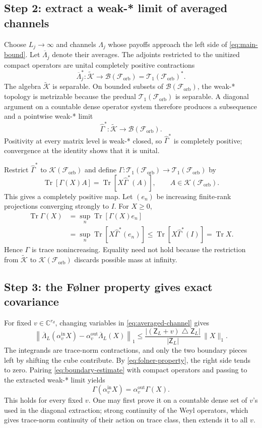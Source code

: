 \documentclass[11pt]{article}
\newcommand{\F}{\mathcal F_{\mathrm{orb}}}
\newcommand{\T}{\mathcal T_1}
\newcommand{\K}{\mathcal K}
\newcommand{\Bop}{\mathcal B}
\newcommand{\C}{\mathbb C}
\newcommand{\Tr}{\operatorname{Tr}}
\begin{document}
\subsection{Step 2: extract a weak-* limit of averaged channels}

Choose $L_j\to\infty$ and channels $\Lambda_j$ whose payoffs approach the
left side of \eqref{eq:main-bound}.  Let $\overline\Lambda_j$ denote their
averages.  The adjoints restricted to the unitized compact operators are
unital completely positive contractions
\[
  \overline\Lambda_j^*:
  \widetilde{\K}\longrightarrow\Bop(\F)=\T(\F)^*.
\]
The algebra $\widetilde{\K}$ is separable.  On bounded subsets of
$\Bop(\F)$, the weak-* topology is metrizable because the predual
$\T(\F)$ is separable.  A diagonal argument on a countable dense operator
system therefore produces a subsequence and a pointwise weak-* limit
\[
  \widehat\Gamma^*:
  \widetilde{\K}\longrightarrow\Bop(\F).
\]
Positivity at every matrix level is weak-* closed, so
$\widehat\Gamma^*$ is completely positive; convergence at the identity
shows that it is unital.

Restrict $\widehat\Gamma^*$ to $\K(\F)$ and define
$\Gamma:\T(\F)\to\T(\F)$ by
\begin{equation}\label{eq:limit-duality}
  \Tr[\Gamma(X)A]=\Tr[X\widehat\Gamma^*(A)],
  \qquad A\in\K(\F).
\end{equation}
This gives a completely positive map.  Let $(e_n)$ be increasing
finite-rank projections converging strongly to $I$.  For $X\geq0$,
\begin{align*}
  \Tr\Gamma(X)
  &=\sup_n\Tr[\Gamma(X)e_n]\\
  &=\sup_n\Tr[X\widehat\Gamma^*(e_n)]
  \leq\Tr[X\widehat\Gamma^*(I)]
  =\Tr X.
\end{align*}
Hence $\Gamma$ is trace nonincreasing.  Equality need not hold because the
restriction from $\widetilde{\K}$ to $\K(\F)$ discards possible mass at
infinity.

\subsection{Step 3: the F\o lner property gives exact covariance}

For fixed $v\in\C^{r_d}$, changing variables in
\eqref{eq:averaged-channel} gives
\begin{equation}\label{eq:boundary-estimate}
  \left\|
  \overline\Lambda_L(\alpha_v^{\mathrm{in}}X)
  -\alpha_v^{\mathrm{out}}\overline\Lambda_L(X)
  \right\|_1
  \leq
  \frac{|(\mathsf Z_L+v)\mathbin\triangle\mathsf Z_L|}
       {|\mathsf Z_L|}\,\|X\|_1.
\end{equation}
The integrands are trace-norm contractions, and only the two boundary pieces
left by shifting the cube contribute.  By \eqref{eq:folner-property}, the
right side tends to zero.  Pairing \eqref{eq:boundary-estimate} with compact
operators and passing to the extracted weak-* limit yields
\[
  \Gamma(\alpha_v^{\mathrm{in}}X)
  =\alpha_v^{\mathrm{out}}\Gamma(X).
\]
This holds for every fixed $v$.  One may first prove it on a countable dense
set of $v$'s used in the diagonal extraction; strong continuity of the Weyl
operators, which gives trace-norm continuity of their action on trace class,
then extends it to all $v$.
\end{document}
